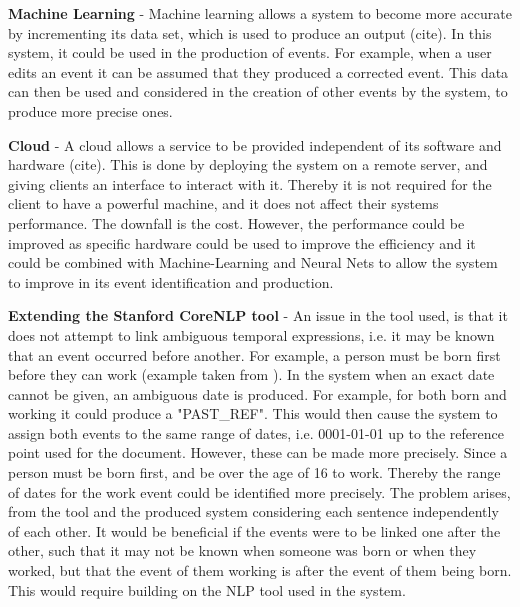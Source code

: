 \par \textbf{Machine Learning} - Machine learning allows a system to become more accurate by incrementing its data set, which is used to produce an output (cite). In this system, it could be used in the production of events. For example, when a user edits an event it can be assumed that they produced a corrected event. This data can then be used and considered in the creation of other events by the system, to produce more precise ones.

\par \textbf{Cloud} - A cloud allows a service to be provided independent of its software and hardware (cite). This is done by deploying the system on a remote server, and giving clients an interface to interact with it. Thereby it is not required for the client to have a powerful machine, and it does not affect their systems performance. The downfall is the cost. However, the performance could be improved as specific hardware could be used to improve the efficiency and it could be combined with Machine-Learning and Neural Nets to allow the system to improve in its event identification and production.

\par \textbf{Extending the Stanford CoreNLP tool} - An issue in the tool used, is that it does not attempt to link ambiguous temporal expressions, i.e. it may be known that an event occurred before another. For example, a person must be born first before they can work (example taken from \cite{mccloskymanning2012}). In the system when an exact date cannot be given, an ambiguous date is produced. For example, for both born and working it could produce a "PAST\_REF". This would then cause the system to assign both events to the same range of dates, i.e. 0001-01-01 up to the reference point used for the document. However, these can be made more precisely.  Since a person must be born first, and be over the age of 16 to work. Thereby the range of dates for the work event could be identified more precisely. The problem arises, from the tool and the produced system considering each sentence independently of each other. It would be beneficial if the events were to be linked one after the other, such that it may not be known when someone was born or when they worked, but that the event of them working is after the event of them being born. This would require building on the NLP tool used in the system.